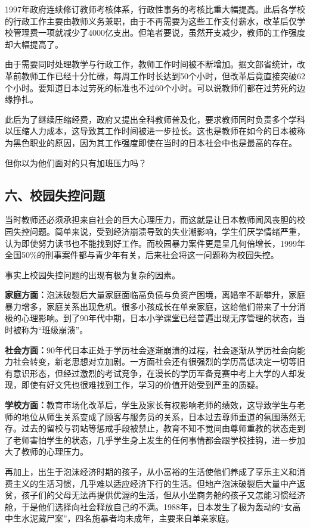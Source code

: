 1997年政府连续修订教师考核体系，行政性事务的考核比重大幅提高。此后各学校的行政工作主要由教师义务兼职，由于不再需要为这些工作支付薪水，改革后仅学校管理费一项就减少了4000亿支出。但笔者要说，虽然开支减少，教师的工作强度却大幅提高了。

由于需要同时处理教学与行政工作，教师工作时间被不断增加。据文部省统计，改革前教师工作已经十分忙碌，每周工作时长达到50个小时，但改革后竟直接突破62个小时。要知道日本过劳死的标准也不过60个小时。可以说教师们都在过劳死的边缘挣扎。

此后为了继续压缩经费，政府又提出全科教师普及化，要求教师同时负责多个学科以压缩人力成本，这导致其工作时间被进一步拉长。这也是教师在如今的日本被称为黑色职业的原因，因为其工作强度即使在当时的日本社会中也是最高的存在。

但你以为他们面对的只有加班压力吗？

\subsection{六、校园失控问题}

当时教师还必须承担来自社会的巨大心理压力，而这就是让日本教师闻风丧胆的校园失控问题。简单来说，受到经济崩溃导致的失业潮影响，学生们厌学情绪严重，认为即使努力读书也不能找到好工作。而校园暴力案件更是呈几何倍增长，1999年全国50\%的刑事案件都与青少年有关，后来社会将这一问题称为校园失控。

事实上校园失控问题的出现有极为复杂的因素。

\textbf{家庭方面：}泡沫破裂后大量家庭面临高负债与负资产困境，离婚率不断攀升，家庭暴力增多，家庭关系出现危机。很多小孩成长在单亲家庭，这给他们带来了十分消极的心理影响。到了90年代中期，日本小学课堂已经普遍出现无序管理的状态，当时被称为“班级崩溃”。

\textbf{社会方面：}90年代日本正处于学历社会逐渐崩溃的过程，社会逐渐从学历社会向能力社会转变，新老思想对立加剧。一方面社会还有很强烈的学历高低决定一切等旧有意识形态，但经过激烈的考试竞争，在漫长的学历军备竞赛中考上大学的人却发现，即使有好文凭也很难找到工作，学习的价值开始受到严重的质疑。

\textbf{学校方面：}教育市场化改革后，学生及家长有权影响老师的绩效，这导致学生与老师的地位从师生关系变成了顾客与服务员的关系，日本过去尊师重道的氛围荡然无存。过去的留校与罚站等惩戒手段被禁止，教育不知不觉间由尊师重教的状态走到了老师害怕学生的状态，几乎学生身上发生的任何事情都会跟学校挂钩，进一步加大了教师的心理压力。

再加上，出生于泡沫经济时期的孩子，从小富裕的生活使他们养成了享乐主义和消费主义的生活习惯，几乎难以适应经济下行的生活。但地产泡沫破裂后大量中产返贫，孩子们的父母无法再提供优渥的生活，但从小坐商务舱的孩子又怎能习惯经济舱，于是他们选择向社会释放自己的不满。1988年，日本发生了极为轰动的“女高中生水泥藏尸案”，四名施暴者均未成年，主要来自单亲家庭。


